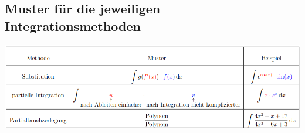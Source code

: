 \subsection{Muster für die jeweiligen Integrationsmethoden}

\begin{center}
  \includegraphics[width=0.9\linewidth]{images/muster.png}
\end{center}
